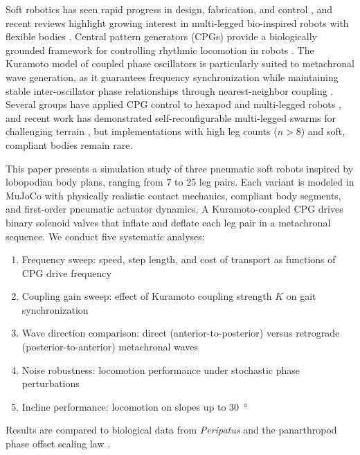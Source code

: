 \documentclass[12pt]{article}
\begin{document}
Soft robotics has seen rapid progress in design, fabrication, and
control \citep{rus2015design}, and recent reviews highlight growing
interest in multi-legged bio-inspired robots with flexible bodies
\citep{li2024bionic}.
Central pattern generators (CPGs) provide a biologically grounded
framework for controlling rhythmic locomotion in robots
\citep{ijspeert2008central}.
The Kuramoto model of coupled phase oscillators is particularly suited
to metachronal wave generation, as it guarantees frequency
synchronization while maintaining stable inter-oscillator phase
relationships through nearest-neighbor coupling
\citep{kuramoto1984chemical, strogatz2000kuramoto}.
Several groups have applied CPG control to hexapod and multi-legged
robots \citep{owaki2017quadruped, yasui2017decentralized}, and
recent work has demonstrated self-reconfigurable multi-legged swarms
for challenging terrain \citep{ozkanaydin2021selfreconfigurable},
but implementations with high leg counts ($n > 8$) and soft, compliant
bodies remain rare.

This paper presents a simulation study of three pneumatic soft robots
inspired by lobopodian body plans, ranging from 7 to 25 leg pairs.
Each variant is modeled in MuJoCo with physically realistic contact
mechanics, compliant body segments, and first-order pneumatic actuator
dynamics.
A Kuramoto-coupled CPG drives binary solenoid valves that inflate
and deflate each leg pair in a metachronal sequence.
We conduct five systematic analyses:
\begin{enumerate}
    \item Frequency sweep: speed, step length, and cost of transport
          as functions of CPG drive frequency
    \item Coupling gain sweep: effect of Kuramoto coupling strength $K$
          on gait synchronization
    \item Wave direction comparison: direct (anterior-to-posterior)
          versus retrograde (posterior-to-anterior) metachronal waves
    \item Noise robustness: locomotion performance under stochastic
          phase perturbations
    \item Incline performance: locomotion on slopes up to
          \SI{30}{\degree}
\end{enumerate}
Results are compared to biological data from \textit{Peripatus}
\citep{manton1950locomotory} and the panarthropod phase offset scaling
law \citep{nirody2021universal}.


\end{document}
